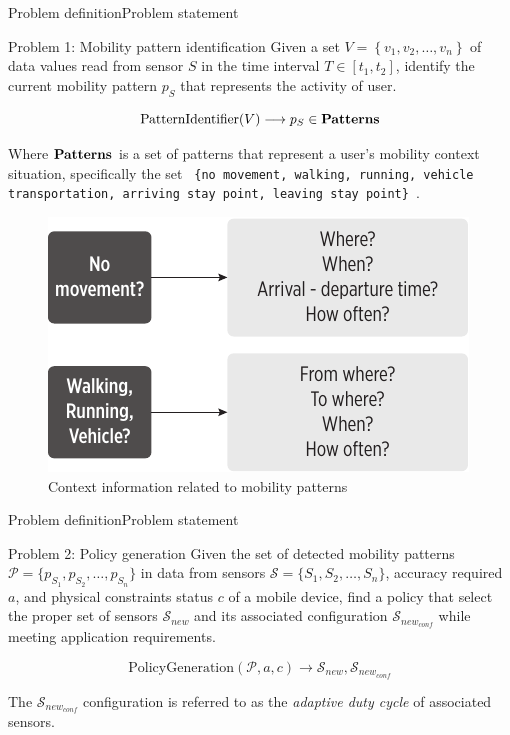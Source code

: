 \documentclass[10pt,xcolor={dvipsnames},handout]{beamer}
\begin{document}
\begin{frame}{Problem definition}{Problem statement}
\begin{alertblock}{Problem 1: Mobility pattern identification}
\small
Given a set $V = \left\{v_{1}, v_{2}, \dotsc, v_{n}\right\}$ of data values read from sensor $S$ in the time interval $T  \in [t_{1}, t_{2}]$, identify the current mobility pattern $p_{S}$ that represents the activity of user.

\begin{equation}
  \text{PatternIdentifier}( V ) \longrightarrow{} p_{S} \in \text{\textbf{Patterns}}
\end{equation}

Where $\text{\textbf{Patterns}}$ is a set of patterns that represent a user's mobility context situation, specifically the set \scriptsize{\texttt{ \{no movement, walking, running, vehicle transportation, arriving stay point, leaving stay point\} }}.
\pause
\begin{figure}[tb]
  \centering
  \includegraphics[scale=0.55]{vectors/mobility-patterns-implications}
  \caption{Context information related to mobility patterns}
  \label{fig:mobility-patterns-implications}
\end{figure}
\end{alertblock}
\end{frame}

\begin{frame}{Problem definition}{Problem statement}
\begin{alertblock}{Problem 2: Policy generation}
\small
Given the set of detected mobility patterns $\mathcal{P} = \{ p_{S_1}, p_{S_2}, \ldots, p_{S_n} \}$ in data from sensors $\mathcal{S} = \{ S_1,S_2,\ldots, S_n \}$, accuracy required $a$, and physical constraints status $c$ of a mobile device, find a policy that select the proper set of sensors $\mathcal{S}_{new}$ and its associated configuration $\mathcal{S}_{new_{conf}}$  while meeting application requirements.

\begin{equation}
  \text{PolicyGeneration}( \mathcal{P}, a, c ) \longrightarrow{} \mathcal{S}_{new}, \mathcal{S}_{new_{conf}}
\end{equation}

The $\mathcal{S}_{new_{conf}}$ configuration is referred to as the \emph{adaptive duty cycle} of associated sensors.
\end{alertblock}
\end{frame}
\end{document}
